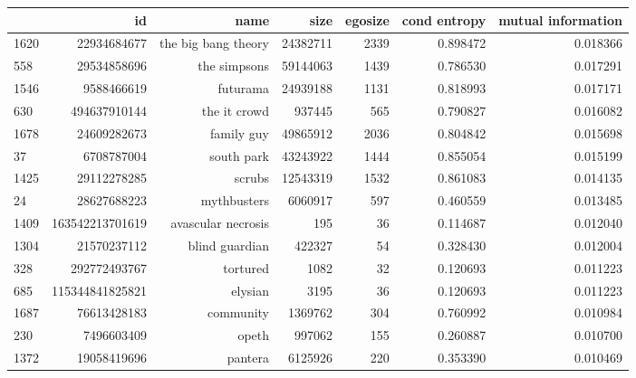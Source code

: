 \documentclass[letterpaper]{article}
\begin{document}
\begin{figure}
\begin{table}
\begin{tabular}{| >{\small}l | >{\small}r | >{\small}r | >{\small}r | >{\small}r | >{\small}r |>{\small}r |}
\hline
{} &               id &                 name &      size &  egosize &  cond entropy &  mutual information \\
\hline
1620 &      22934684677 &  the big bang theory &  24382711 &     2339 &             0.898472 &            0.018366 \\
558  &      29534858696 &         the simpsons &  59144063 &     1439 &             0.786530 &            0.017291 \\
1546 &       9588466619 &             futurama &  24939188 &     1131 &             0.818993 &            0.017171 \\
630  &     494637910144 &         the it crowd &    937445 &      565 &             0.790827 &            0.016082 \\
1678 &      24609282673 &           family guy &  49865912 &     2036 &             0.804842 &            0.015698 \\
37   &       6708787004 &           south park &  43243922 &     1444 &             0.855054 &            0.015199 \\
1425 &      29112278285 &               scrubs &  12543319 &     1532 &             0.861083 &            0.014135 \\
24   &      28627688223 &          mythbusters &   6060917 &      597 &             0.460559 &            0.013485 \\
1409 &  163542213701619 &   avascular necrosis &       195 &       36 &             0.114687 &            0.012040 \\
1304 &      21570237112 &       blind guardian &    422327 &       54 &             0.328430 &            0.012004 \\
328  &     292772493767 &             tortured &      1082 &       32 &             0.120693 &            0.011223 \\
685  &  115344841825821 &              elysian &      3195 &       36 &             0.120693 &            0.011223 \\
1687 &      76613428183 &            community &   1369762 &      304 &             0.760992 &            0.010984 \\
230  &       7496603409 &                opeth &    997062 &      155 &             0.260887 &            0.010700 \\
1372 &      19058419696 &              pantera &   6125926 &      220 &             0.353390 &            0.010469 \\

\end{tabular}
\end{table}
\end{figure}
\end{document}
